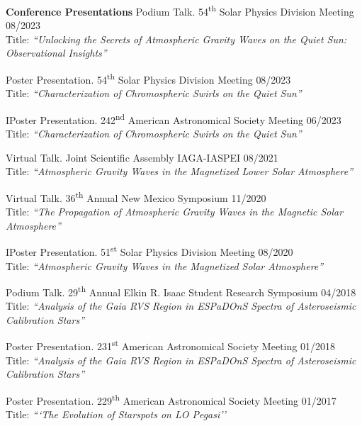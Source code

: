 \documentclass{resume} %
\begin{document}
\vspace{-0.1in}
\begin{rSection}{\textbf{Conference Presentations}}
\vspace{0.02in}
{Podium Talk. 54\textsuperscript{th} Solar Physics Division Meeting \hfill{08/2023} \\ Title: \emph{``Unlocking the Secrets of Atmospheric Gravity Waves on the Quiet Sun: Observational Insights''}}

{Poster Presentation. 54\textsuperscript{th} Solar Physics Division Meeting \hfill{08/2023} \\  Title: \emph{``Characterization of Chromospheric Swirls on the Quiet Sun''}}

{IPoster Presentation. 242\textsuperscript{nd} American Astronomical Society  Meeting \hfill{06/2023} \\ Title: \emph{``Characterization of Chromospheric Swirls on the Quiet Sun''}}

{Virtual Talk. Joint Scientific Assembly IAGA-IASPEI \hfill{08/2021} \\ Title: \emph{``Atmospheric Gravity Waves in the Magnetized Lower Solar Atmosphere''}} 

{Virtual Talk. 36\textsuperscript{th} Annual New Mexico Symposium \hfill{11/2020} \\ Title: \emph{``The Propagation of Atmospheric Gravity Waves in the Magnetic Solar Atmosphere''}}

{IPoster Presentation. 51\textsuperscript{st} Solar Physics Division Meeting \hfill{08/2020} \\ Title: \emph{``Atmospheric Gravity Waves in the Magnetized Solar Atmosphere''}}


{Podium Talk. 29\textsuperscript{th} Annual Elkin R. Isaac Student Research Symposium \hfill{04/2018} \\ Title: \emph{``Analysis of the Gaia RVS Region in ESPaDOnS Spectra of Asteroseismic Calibration Stars''}}

{Poster Presentation. 231\textsuperscript{st} American Astronomical Society Meeting \hfill{01/2018} \\ Title: \emph{``Analysis of the Gaia RVS Region in ESPaDOnS Spectra of Asteroseismic Calibration
Stars''}} 

{Poster Presentation. 229\textsuperscript{th} American Astronomical Society Meeting \hfill{01/2017} \\ Title: \emph{```The Evolution of Starspots on LO Pegasi''}}
\end{rSection}
\end{document}
